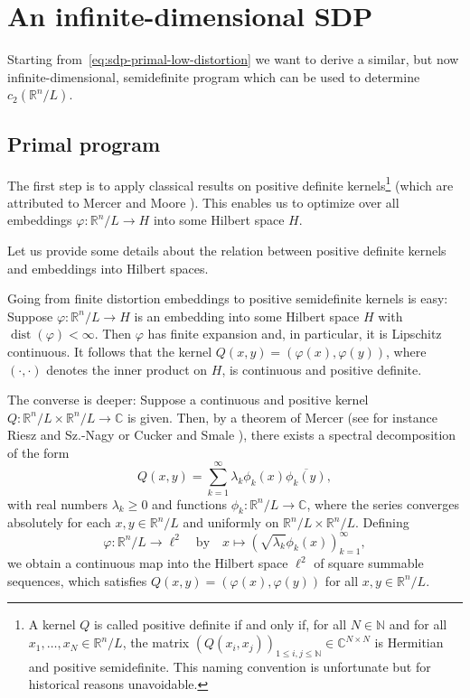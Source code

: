 \documentclass{amsart}
\newcommand{\C}{\mathbb{C}}
\newcommand{\R}{\mathbb{R}}
\newcommand{\N}{\mathbb{N}}
\DeclareMathOperator{\dist}{dist}
\begin{document}
%
%
%

\section{An infinite-dimensional SDP}
\label{sec:SDP}

Starting from~\eqref{eq:sdp-primal-low-distortion} we want to derive a
similar, but now infinite-dimensional, semidefinite program which can
be used to determine $c_2(\R^n/L)$.

%
%
%

\subsection{Primal program}

The first step is to apply classical results on positive definite kernels\footnote{A kernel $Q$ is called positive
definite if and only if, for all $N \in \N$ and for all $x_1, \ldots, x_N \in \R^n / L$, the matrix
$(Q(x_i,x_j))_{1 \leq i,j \leq \N} \in \C^{N \times N}$ is Hermitian
and positive semidefinite. This naming convention is unfortunate but
for historical reasons unavoidable.} (which are attributed to Mercer \cite{Mercer1909a} and Moore \cite{Moore1916a}). This 
enables us to optimize over all embeddings $\varphi : \R^n / L \to H$ into some Hilbert space $H$. 

Let us provide some details about the relation between positive definite kernels and embeddings into Hilbert spaces.

Going from finite distortion embeddings to positive semidefinite kernels is easy: Suppose $\varphi : \R^n / L \to H$ is an embedding into some Hilbert space $H$ with $\dist(\varphi) < \infty$. Then $\varphi$ has finite expansion and, in particular, it is Lipschitz continuous. It follows that the kernel $Q(x,y) = (\varphi(x), \varphi(y))$, where $(\cdot , \cdot)$ denotes the inner product on $H$, is continuous and positive definite.

The converse is deeper: Suppose a continuous and positive kernel $Q : \R^n / L \times \R^n / L \to \C$ is given. Then, by a theorem of Mercer (see for instance Riesz and Sz.-Nagy \cite[$\S$ 98]{Riesz1990a} or Cucker and Smale \cite[Chapter III]{Cucker2001}), there exists a spectral decomposition of the form
\[
Q(x,y) = \sum_{k=1}^\infty \lambda_k \phi_k(x) \overline{\phi_k(y)},
\]
with real numbers $\lambda_k \geq 0$ and functions $\phi_k : \R^n / L \to \C$, where the series converges absolutely for each $x, y \in \R^n / L$ and uniformly on $\R^n / L \times \R^n / L$. Defining 
\[
\varphi : \R^n / L \to \ell^2 \quad \text{by} \quad x \mapsto (\sqrt{\lambda_k} \phi_k(x))_{k=1}^\infty,
\]
we obtain a continuous map into the Hilbert space $\ell^2$ of square summable sequences, which satisfies $Q(x,y) = (\varphi(x), \varphi(y))$ for all $x,y \in \R^n / L$.
\end{document}
